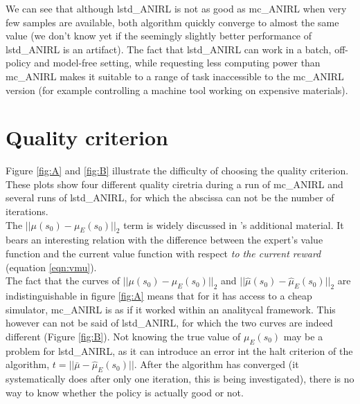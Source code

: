 \documentclass{article}
\begin{document}
We can see that although lstd\_ANIRL is not as good as mc\_ANIRL when very few samples are available, both algorithm quickly converge to almost the same value (we don't know yet if the seemingly slightly better performance of lstd\_ANIRL is an artifact). The fact that lstd\_ANIRL can work in a batch, off-policy and model-free setting, while requesting less computing power than mc\_ANIRL makes it suitable to a range of task inaccessible to the mc\_ANIRL version (for example controlling a machine tool working on expensive materials).
\section{Quality criterion}

Figure \ref{fig:A} and \ref{fig:B} illustrate the difficulty of choosing the quality criterion. These plots show four different quality ciretria during a run of mc\_ANIRL and several runs of lstd\_ANIRL, for which the abscissa can not be the number of iterations.\\

The $||\mu(s_0) - \mu_E(s_0)||_2$ term is widely discussed in \citep{abbeel2004apprenticeship}'s additional material. It bears an interesting relation with the difference between the expert's value function and the current value function with respect \emph{to the current reward} (equation \ref{eqn:vmu}).\\

The fact that  the curves of  $||\mu(s_0) - \mu_E(s_0)||_2$ and $||\hat\mu(s_0) - \hat\mu_E(s_0)||_2$ are indistinguishable in figure \ref{fig:A} means that for it has access to a cheap simulator, mc\_ANIRL is as if it worked within an analitycal framework. This however can not be said of lstd\_ANIRL, for which the two curves are indeed different (Figure \ref{fig:B}). Not knowing the true value of $\mu_E(s_0)$ may be a problem for lstd\_ANIRL, as it can introduce an error int the halt criterion of the algorithm, $t = ||\bar\mu-\hat\mu_E(s_0)||$. After the algorithm has converged (it systematically does after only one iteration, this is being investigated), there is no way to know whether the policy is actually good or not.\\
\end{document}
